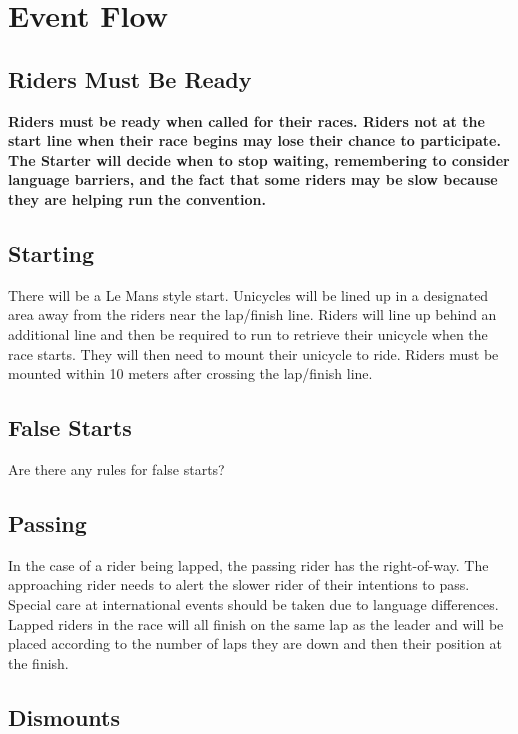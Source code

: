 \section{Event Flow}

\subsection{Riders Must Be Ready}

\textbf{Riders must be ready when called for their races.
Riders not at the start line when their race begins may lose their chance to participate.
The Starter will decide when to stop waiting, remembering to consider language barriers, and the fact that some riders may be slow because they are helping run the convention.}

\subsection{Starting}

There will be a Le Mans style start.
Unicycles will be lined up in a designated area away from the riders near the lap/finish line.
Riders will line up behind an additional line and then be required to run to retrieve their unicycle when the race starts.
They will then need to mount their unicycle to ride.
Riders must be mounted within 10 meters after crossing the lap/finish line.

\subsection{False Starts}

\begin{framed}
Are there any rules for false starts?
\end{framed}

\subsection{Passing}

In the case of a rider being lapped, the passing rider has the right-of-way.
The approaching rider needs to alert the slower rider of their intentions to pass.
Special care at international events should be taken due to language differences.
Lapped riders in the race will all finish on the same lap as the leader and will be placed according to the number of laps they are down and then their position at the finish.

\subsection{Dismounts}

